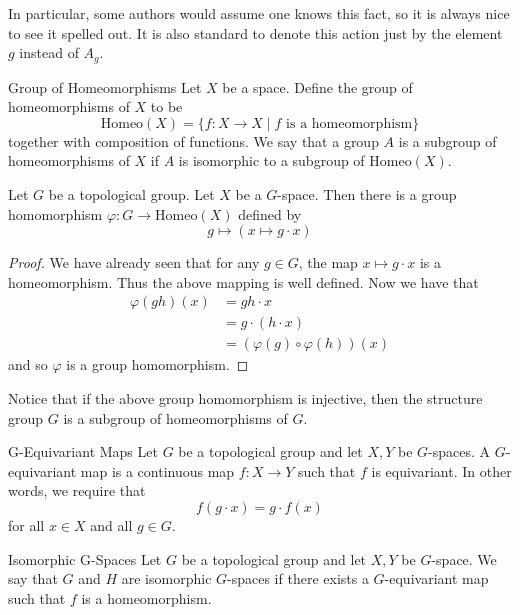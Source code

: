 \documentclass[a4paper]{article}
\begin{document}
In particular, some authors would assume one knows this fact, so it is always nice to see it spelled out. It is also standard to denote this action just by the element $g$ instead of $A_g$. 

\begin{defn}{Group of Homeomorphisms}{} Let $X$ be a space. Define the group of homeomorphisms of $X$ to be $$\text{Homeo}(X)=\{f:X\to X\;|\;f\text{ is a homeomorphism}\}$$ together with composition of functions. We say that a group $A$ is a subgroup of homeomorphisms of $X$ if $A$ is isomorphic to a subgroup of $\text{Homeo}(X)$. 
\end{defn}

\begin{lmm}{}{} Let $G$ be a topological group. Let $X$ be a $G$-space. Then there is a group homomorphism $\varphi:G\to\text{Homeo}(X)$ defined by $$g\mapsto\left(x\mapsto g\cdot x\right)$$ \tcbline
\begin{proof}
We have already seen that for any $g\in G$, the map $x\mapsto g\cdot x$ is a homeomorphism. Thus the above mapping is well defined. Now we have that 
\begin{align*}
\varphi(gh)(x)&=gh\cdot x\\
&=g\cdot(h\cdot x)\\
&=(\varphi(g)\circ\varphi(h))(x)
\end{align*}
and so $\varphi$ is a group homomorphism. 
\end{proof}
\end{lmm}

Notice that if the above group homomorphism is injective, then the structure group $G$ is a subgroup of homeomorphisms of $G$. 

\begin{defn}{G-Equivariant Maps}{} Let $G$ be a topological group and let $X,Y$ be $G$-spaces. A $G$-equivariant map is a continuous map $f:X\to Y$ such that $f$ is equivariant. In other words, we require that $$f(g\cdot x)=g\cdot f(x)$$ for all $x\in X$ and all $g\in G$. 
\end{defn}

\begin{defn}{Isomorphic G-Spaces}{} Let $G$ be a topological group and let $X,Y$ be $G$-space. We say that $G$ and $H$ are isomorphic $G$-spaces if there exists a $G$-equivariant map such that $f$ is a homeomorphism. 
\end{defn}
\end{document}
